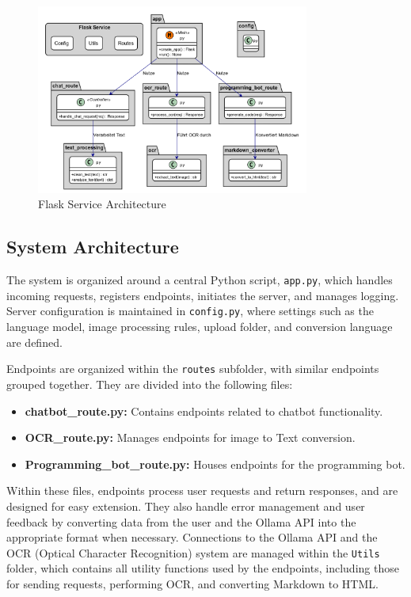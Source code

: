 \begin{figure}[h]
    \centering
    \includegraphics[width=0.8\textwidth]{figures/flask_service.png}
    \caption{Flask Service Architecture}
    \label{fig:flask_service_architecture}
\end{figure}

\subsection{System Architecture}

The system is organized around a central Python script, \texttt{app.py}, which handles incoming requests, registers endpoints, initiates the server, and manages logging. Server configuration is maintained in \texttt{config.py}, where settings such as the language model, image processing rules, upload folder, and conversion language are defined.

Endpoints are organized within the \texttt{routes} subfolder, with similar endpoints grouped together. They are divided into the following files:
\begin{itemize}
    \item \textbf{chatbot\_route.py:} Contains endpoints related to chatbot functionality.
    \item \textbf{OCR\_route.py:} Manages endpoints for image to Text conversion.
    \item \textbf{Programming\_bot\_route.py:} Houses endpoints for the programming bot.
\end{itemize}

Within these files, endpoints process user requests and return responses, and are designed for easy extension. They also handle error management and user feedback by converting data from the user and the Ollama API into the appropriate format when necessary. Connections to the Ollama API and the OCR (Optical Character Recognition) system are managed within the \texttt{Utils} folder, which contains all utility functions used by the endpoints, including those for sending requests, performing OCR, and converting Markdown to HTML.

